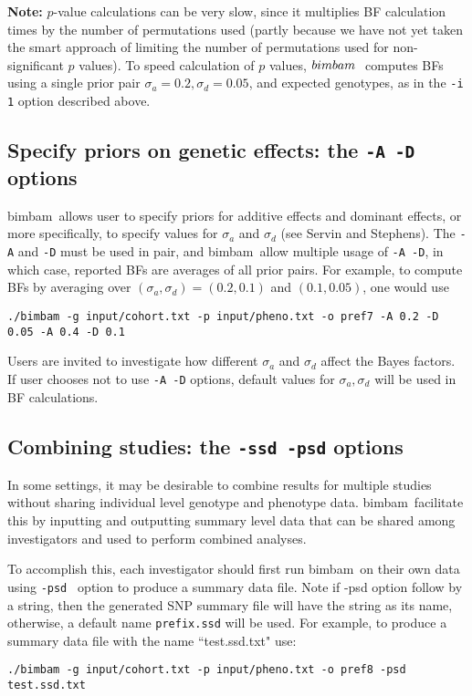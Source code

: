 \documentclass[11pt,Palatino]{article}
\def\bimbam{{\sc bimbam}~}
\begin{document}
{\bf Note:} $p$-value calculations can be very slow, since it multiplies
BF calculation times by the number of permutations used (partly because we have not yet taken the smart approach of limiting the number of permutations used for non-significant $p$ values). To speed calculation of $p$ values, $\bimbam$ computes BFs using
a single prior pair  $\sigma_a= 0.2, \sigma_d= 0.05$, and expected genotypes, as in the {\tt -i 1} option described above.


\subsection{Specify priors on genetic effects: the {\tt -A -D} options}
\bimbam allows user to specify priors for additive effects and dominant effects, or more specifically, to specify values for $\sigma_a$ and $\sigma_d$ (see Servin and Stephens). The {\tt -A} and {\tt -D} must be used in pair, and \bimbam allow multiple usage of {\tt -A -D}, in which case, reported BFs are averages of all prior pairs.  For example, to compute BFs by averaging over $(\sigma_a, \sigma_d) = (0.2, 0.1)$ and $(0.1, 0.05)$, one would use
\begin{verbatim}
./bimbam -g input/cohort.txt -p input/pheno.txt -o pref7 -A 0.2 -D 0.05 -A 0.4 -D 0.1
\end{verbatim}
Users are invited to investigate how different $\sigma_a$ and $\sigma_d$ affect the Bayes factors. If user chooses not to use {\tt -A -D} options, default values for $\sigma_a, \sigma_d$ will be used in BF calculations.

\subsection{Combining studies: the {\tt -ssd -psd} options}

In some settings, it may be desirable to combine results for multiple studies without sharing individual level genotype and phenotype data. \bimbam facilitate this by inputting and outputting summary level data that can be shared among investigators and used to perform combined analyses.

To accomplish this, each investigator should first run \bimbam on their own data using {\tt -psd } option to produce a summary data file.
Note if -psd option follow by a string, then the generated SNP summary file will have the string as its name, otherwise, a default name
{\tt prefix.ssd} will be used.
For example, to produce a summary data file with the name ``test.ssd.txt" use:
\begin{verbatim}
./bimbam -g input/cohort.txt -p input/pheno.txt -o pref8 -psd test.ssd.txt
\end{verbatim}
\end{document}
